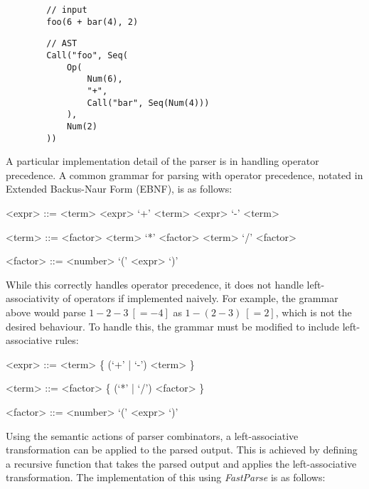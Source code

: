 \begin{tcolorbox}
    \begin{verbatim}
        // input
        foo(6 + bar(4), 2)
    \end{verbatim}
    \tcblower
    \begin{verbatim}
        // AST
        Call("foo", Seq(
            Op(
                Num(6),
                "+",
                Call("bar", Seq(Num(4)))
            ),
            Num(2)
        ))
    \end{verbatim}
\end{tcolorbox}

A particular implementation detail of the parser is in handling operator precedence. A common
grammar for parsing with operator precedence, notated in Extended Backus-Naur Form (EBNF), is as
follows:

\begin{center}
    \begin{grammar}
        <expr> ::= <term>
        \alt <expr> `+' <term>
        \alt <expr> `-' <term>

        <term> ::= <factor>
        \alt <term> `*' <factor>
        \alt <term> `/' <factor>

        <factor> ::= <number>
        \alt `(' <expr> `)'
    \end{grammar}
\end{center}

While this correctly handles operator precedence, it does not handle left-associativity of
operators if implemented naively. For example, the grammar above would parse
\(1 - 2 - 3 ~[= -4]\) as \(1 - (2 - 3) ~[=2]\),
which is not the desired behaviour. To handle this, the grammar must be modified to include
left-associative rules:

\begin{grammar}
    <expr> ::= <term> \{ (`+' | `-') <term> \}

    <term> ::= <factor> \{ (`*' | `/') <factor> \}

    <factor> ::= <number>
    \alt `(' <expr> `)'
\end{grammar}

Using the semantic actions of parser combinators, a left-associative transformation can be
applied to the parsed output. This is achieved by defining a recursive function that takes the
parsed output and applies the left-associative transformation. The implementation of this using
\emph{FastParse} is as follows:


